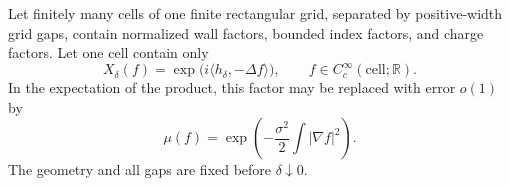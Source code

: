 \begin{lemma}
\label{q4field:neutral-removal}
Let finitely many cells of one finite rectangular grid, separated
by positive-width grid gaps, contain normalized
wall factors, bounded index factors, and charge factors.  Let one
cell contain only
\[
 X_\delta(f)=\exp\bigl(i\langle h_\delta,-\Delta f\rangle\bigr),
 \qquad f\in C_c^\infty(\text{cell};\mathbb R).
\]
In the expectation of
the product, this factor may be replaced with error $o(1)$ by
\begin{equation}\label{q4field:neutral-mean}
 \mu(f)=\exp\left(-\frac{\sigma^2}{2}
                            \int|\nabla f|^2\right).
\end{equation}
The geometry and all gaps are fixed before $\delta\downarrow0$.
\end{lemma}

